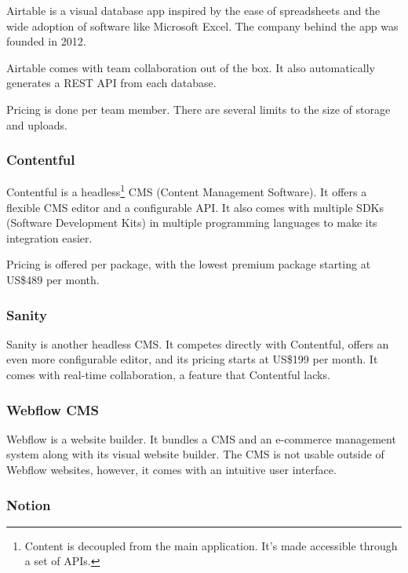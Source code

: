 
Airtable is a visual database app inspired by the ease of spreadsheets
and the wide adoption of software like Microsoft Excel. The company
behind the app was founded in 2012.

Airtable comes with team collaboration out of the box. It also
automatically generates a REST API from each database.

Pricing is done per team member. There are several limits to the size of
storage and uploads.

\subsubsection{Contentful}


Contentful is a headless\footnote{Content is decoupled from the main
	application. It's made accessible through a set of APIs.} CMS (Content
Management Software). It offers a flexible CMS editor and a configurable
API. It also comes with multiple SDKs (Software Development Kits) in
multiple programming languages to make its integration easier.

Pricing is offered per package, with the lowest premium package starting
at US\$489 per month.

\subsubsection{Sanity}


Sanity is another headless CMS. It competes directly with Contentful,
offers an even more configurable editor, and its pricing starts at
US\$199 per month. It comes with real-time collaboration, a feature that
Contentful lacks.

\subsubsection{Webflow CMS}


Webflow is a website builder. It bundles a CMS and an e-commerce
management system along with its visual website builder. The CMS is not
usable outside of Webflow websites, however, it comes with an intuitive
user interface.

\subsubsection{Notion}

